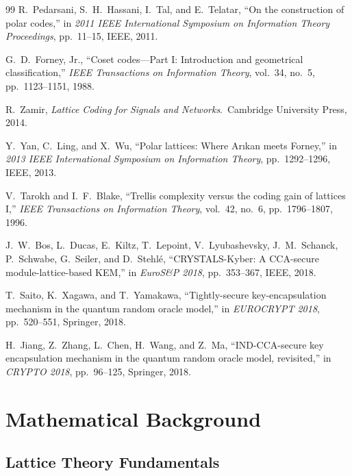 \documentclass[11pt,a4paper]{article}
\begin{document}
\begin{thebibliography}{99}
R.~Pedarsani, S.~H.~Hassani, I.~Tal, and E.~Telatar, ``On the construction of polar codes,'' in \emph{2011 IEEE International Symposium on Information Theory Proceedings}, pp.~11--15, IEEE, 2011.

G.~D.~Forney, Jr., ``Coset codes---Part I: Introduction and geometrical classification,'' \emph{IEEE Transactions on Information Theory}, vol.~34, no.~5, pp.~1123--1151, 1988.

R.~Zamir, \emph{Lattice Coding for Signals and Networks}.\ Cambridge University Press, 2014.

Y.~Yan, C.~Ling, and X.~Wu, ``Polar lattices: Where Ar{\i}kan meets Forney,'' in \emph{2013 IEEE International Symposium on Information Theory}, pp.~1292--1296, IEEE, 2013.

V.~Tarokh and I.~F.~Blake, ``Trellis complexity versus the coding gain of lattices I,'' \emph{IEEE Transactions on Information Theory}, vol.~42, no.~6, pp.~1796--1807, 1996.

J.~W.~Bos, L.~Ducas, E.~Kiltz, T.~Lepoint, V.~Lyubashevsky, J.~M.~Schanck, P.~Schwabe, G.~Seiler, and D.~Stehl\'e, ``CRYSTALS-Kyber: A CCA-secure module-lattice-based KEM,'' in \emph{EuroS\&P 2018}, pp.~353--367, IEEE, 2018.

T.~Saito, K.~Xagawa, and T.~Yamakawa, ``Tightly-secure key-encapsulation mechanism in the quantum random oracle model,'' in \emph{EUROCRYPT 2018}, pp.~520--551, Springer, 2018.

H.~Jiang, Z.~Zhang, L.~Chen, H.~Wang, and Z.~Ma, ``IND-CCA-secure key encapsulation mechanism in the quantum random oracle model, revisited,'' in \emph{CRYPTO 2018}, pp.~96--125, Springer, 2018.

\end{thebibliography}

\appendix
\newpage

\section{Mathematical Background}\label{app:math}

\subsection{Lattice Theory Fundamentals}\label{app:lattice-theory}
\end{document}
